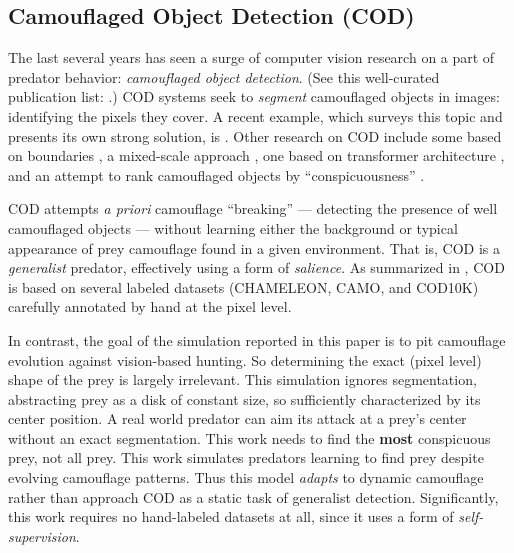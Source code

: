 \documentclass[letterpaper]{article}
\newcommand{\jargon}[1]{\textit{#1}}
\begin{document}
\subsection{Camouflaged Object Detection (COD)}
The last several years has seen a surge of computer vision research on a part of predator behavior: \jargon{camouflaged object detection}. (See this well-curated publication list: \citet{visionxiang_cod}.) COD systems seek to \jargon{segment} camouflaged objects in images: identifying the pixels they cover. A recent example, which surveys this topic and presents its own strong solution, is \citet{Zhang2022}. Other research on COD include some based on boundaries \cite{chen_boundary-guided_2022} \cite{sun_boundary-guided_2022}, a mixed-scale approach \cite{pang_zoom_2022}, one based on transformer architecture \cite{yin_camoformer_2022}, and an attempt to rank camouflaged objects by “conspicuousness” \cite{lv_cod_2022}.
\par
COD attempts \textit{a priori} camouflage “breaking” — detecting the presence of well camouflaged objects — without learning either the background or typical appearance of prey camouflage found in a given environment. That is, COD is a \jargon{generalist} predator, effectively using a form of \jargon{salience}. As summarized in \citet{Zhang2022}, COD is based on several labeled datasets (CHAMELEON, CAMO, and COD10K) carefully annotated by hand at the pixel level.
\par
In contrast, the goal of the simulation reported in this paper is to pit camouflage evolution against vision-based hunting. So determining the exact (pixel level) shape of the prey is largely irrelevant. This simulation ignores segmentation, abstracting prey as a disk of constant size, so sufficiently characterized by its center position. A real world predator can aim its attack at a prey's center without an exact segmentation. This work needs to find the \textbf{most} conspicuous prey, not all prey. This work simulates predators learning to find prey despite evolving camouflage patterns. Thus this model \jargon{adapts} to dynamic camouflage rather than approach COD as a static task of generalist detection. Significantly, this work requires no hand-labeled datasets at all, since it uses a form of \jargon{self-supervision}.
\par

\end{document}
